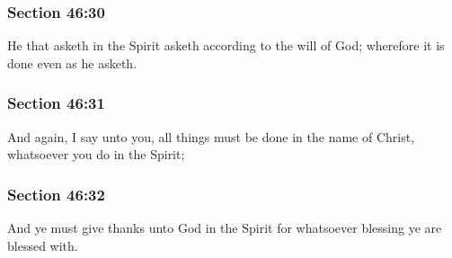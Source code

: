 	\subsubsection{Section 46:30} %
		\label{DC46-30}

		He that asketh in the Spirit asketh according to the will of God; wherefore it is done even as he asketh.


	\subsubsection{Section 46:31} %
		\label{DC46-31}

		And again, I say unto you, all things must be done in the name of Christ, whatsoever you do in the Spirit;


	\subsubsection{Section 46:32} %
		\label{DC46-32}

		And ye must give thanks unto God in the Spirit for whatsoever blessing ye are blessed with.


